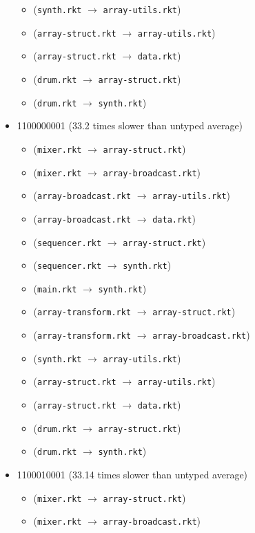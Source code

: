 \documentclass{article}
\newcommand{\mono}[1]{\texttt{#1}}
\begin{document}
\begin{itemize}
\begin{itemize}
  \item (\mono{synth.rkt} $\rightarrow$ \mono{array-utils.rkt})
  \item (\mono{array-struct.rkt} $\rightarrow$ \mono{array-utils.rkt})
  \item (\mono{array-struct.rkt} $\rightarrow$ \mono{data.rkt})
  \item (\mono{drum.rkt} $\rightarrow$ \mono{array-struct.rkt})
  \item (\mono{drum.rkt} $\rightarrow$ \mono{synth.rkt})
  \end{itemize}
\item 1100000001 (33.2 times slower than untyped average)
  \begin{itemize}
  \item (\mono{mixer.rkt} $\rightarrow$ \mono{array-struct.rkt})
  \item (\mono{mixer.rkt} $\rightarrow$ \mono{array-broadcast.rkt})
  \item (\mono{array-broadcast.rkt} $\rightarrow$ \mono{array-utils.rkt})
  \item (\mono{array-broadcast.rkt} $\rightarrow$ \mono{data.rkt})
  \item (\mono{sequencer.rkt} $\rightarrow$ \mono{array-struct.rkt})
  \item (\mono{sequencer.rkt} $\rightarrow$ \mono{synth.rkt})
  \item (\mono{main.rkt} $\rightarrow$ \mono{synth.rkt})
  \item (\mono{array-transform.rkt} $\rightarrow$ \mono{array-struct.rkt})
  \item (\mono{array-transform.rkt} $\rightarrow$ \mono{array-broadcast.rkt})
  \item (\mono{synth.rkt} $\rightarrow$ \mono{array-utils.rkt})
  \item (\mono{array-struct.rkt} $\rightarrow$ \mono{array-utils.rkt})
  \item (\mono{array-struct.rkt} $\rightarrow$ \mono{data.rkt})
  \item (\mono{drum.rkt} $\rightarrow$ \mono{array-struct.rkt})
  \item (\mono{drum.rkt} $\rightarrow$ \mono{synth.rkt})
  \end{itemize}
\item 1100010001 (33.14 times slower than untyped average)
  \begin{itemize}
  \item (\mono{mixer.rkt} $\rightarrow$ \mono{array-struct.rkt})
  \item (\mono{mixer.rkt} $\rightarrow$ \mono{array-broadcast.rkt})

\end{itemize}
\end{itemize}
\end{document}
